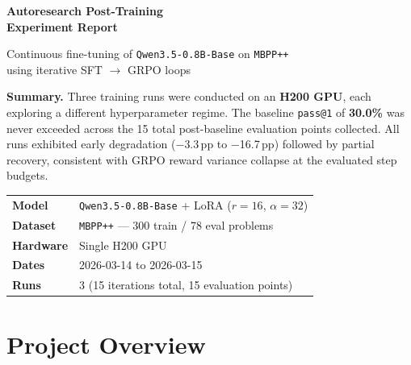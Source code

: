 \documentclass[11pt,a4paper]{article}
\makeatletter
\newcommand{\passkone}{\texttt{pass@1}}
\newcommand{\model}{\texttt{Qwen3.5-0.8B-Base}}
\newcommand{\dataset}{\texttt{MBPP++}}
\makeatother
\begin{document}
\begin{titlepage}
  \centering
  \vspace*{2cm}
  {\Huge\bfseries\color{myblue} Autoresearch Post-Training\\[0.5em]
   Experiment Report\par}
  \vspace{1.5cm}
  {\large Continuous fine-tuning of \model{} on \dataset{}\\
          using iterative SFT $\to$ GRPO loops\par}
  \vspace{2cm}
  \colorbox{accentblue}{\parbox{0.85\textwidth}{%
    \centering\vspace{0.5em}
    \textbf{Summary.}
    Three training runs were conducted on an \textbf{H200 GPU}, each
    exploring a different hyperparameter regime.
    The baseline \passkone{} of \textbf{30.0\%} was never exceeded across
    the 15 total post-baseline evaluation points collected.
    All runs exhibited early degradation ($-$3.3\,pp to $-$16.7\,pp)
    followed by partial recovery, consistent with GRPO reward variance
    collapse at the evaluated step budgets.
    \vspace{0.5em}}}
  \vfill
  \begin{tabular}{ll}
    \toprule
    \textbf{Model}    & \model{} + LoRA ($r{=}16$, $\alpha{=}32$) \\
    \textbf{Dataset}  & \dataset{} — 300 train / 78 eval problems \\
    \textbf{Hardware} & Single H200 GPU \\
    \textbf{Dates}    & 2026-03-14 to 2026-03-15 \\
    \textbf{Runs}     & 3 (15 iterations total, 15 evaluation points) \\
    \bottomrule
  \end{tabular}
\end{titlepage}

\tableofcontents
\newpage

\section{Project Overview}
\end{document}
